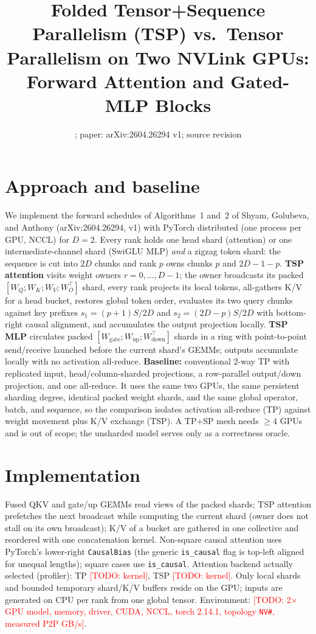 \documentclass[10pt]{article}
\title{\vspace{-1.6em}\large Folded Tensor+Sequence Parallelism (TSP) vs.\ Tensor Parallelism on Two NVLink GPUs:\\ Forward Attention and Gated-MLP Blocks\vspace{-0.6em}}
\author{\small \TODO{author}}
\date{\vspace{-1.2em}\small \TODO{date}; paper: arXiv:2604.26294 v1; source revision \TODO{git rev}}
\newcommand{\TODO}[1]{\textcolor{red}{[TODO: #1]}}
\begin{document}
\maketitle

\section{Approach and baseline}
We implement the forward schedules of Algorithms~1 and~2 of Shyam, Golubeva, and Anthony (arXiv:2604.26294,
v1) with PyTorch distributed (one process per GPU, NCCL) for $D{=}2$. Every rank holds one head shard
(attention) or one intermediate-channel shard (SwiGLU MLP) \emph{and} a zigzag token shard: the sequence
is cut into $2D$ chunks and rank $p$ owns chunks $p$ and $2D{-}1{-}p$.
\textbf{TSP attention} visits weight owners $r=0,\dots,D{-}1$; the owner broadcasts its packed
$[W_Q;W_K;W_V;W_O^{\top}]$ shard, every rank projects its local tokens, all-gathers K/V for a head
bucket, restores global token order, evaluates its two query chunks against key prefixes
$s_1=(p{+}1)S/2D$ and $s_2=(2D{-}p)S/2D$ with bottom-right causal alignment, and accumulates the
output projection locally. \textbf{TSP MLP} circulates packed $[W_\text{gate};W_\text{up};W_\text{down}^{\top}]$
shards in a ring with point-to-point send/receive launched before the current shard's GEMMs; outputs
accumulate locally with no activation all-reduce.
\textbf{Baseline:} conventional 2-way TP with replicated input, head/column-sharded projections, a
row-parallel output/down projection, and one all-reduce. It uses the same two GPUs, the same
persistent sharding degree, identical packed weight shards, and the same global operator, batch, and
sequence, so the comparison isolates activation all-reduce (TP) against weight movement plus K/V
exchange (TSP). A TP+SP mesh needs $\ge 4$ GPUs and is out of scope; the unsharded model serves only
as a correctness oracle.

\section{Implementation}
Fused QKV and gate/up GEMMs read views of the packed shards; TSP attention prefetches the next
broadcast while computing the current shard (owner does not stall on its own broadcast); K/V of a
bucket are gathered in one collective and reordered with one concatenation kernel. Non-square causal
attention uses PyTorch's lower-right \texttt{CausalBias} (the generic \texttt{is\_causal} flag is
top-left aligned for unequal lengths); square cases use \texttt{is\_causal}. Attention backend
actually selected (profiler): TP \TODO{kernel}, TSP \TODO{kernel}. Only local shards and bounded
temporary shard/K/V buffers reside on the GPU; inputs are generated on CPU per rank from one global
tensor. Environment: \TODO{2$\times$GPU model, memory, driver, CUDA, NCCL, torch 2.14.1, topology
\texttt{NV\#}, measured P2P GB/s}.
\end{document}
